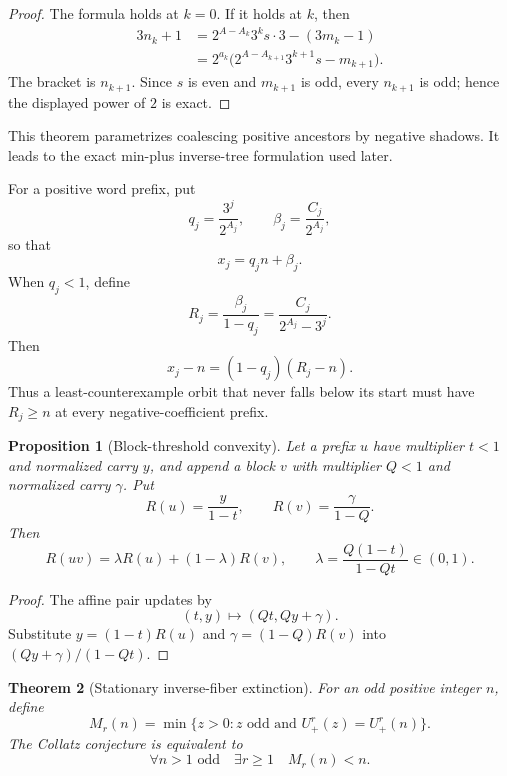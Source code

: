 \documentclass[11pt]{article}
\newtheorem{theorem}{Theorem}[section]
\newtheorem{proposition}[theorem]{Proposition}
\theoremstyle{definition}
\theoremstyle{remark}
\newcommand{\Up}{U_{+}}
\begin{document}
\begin{proof}
The formula holds at $k=0$.  If it holds at $k$, then
\[
 \begin{aligned}
 3n_k+1
 &=2^{A-A_k}3^ks\cdot3-(3m_k-1)\\
 &=2^{a_k}\bigl(2^{A-A_{k+1}}3^{k+1}s-m_{k+1}\bigr).
 \end{aligned}
\]
The bracket is $n_{k+1}$.  Since $s$ is even and $m_{k+1}$ is odd, every
$n_{k+1}$ is odd; hence the displayed power of $2$ is exact.
\end{proof}

This theorem parametrizes coalescing positive ancestors by negative shadows.
It leads to the exact min-plus inverse-tree formulation used later.

For a positive word prefix, put
\[
 q_j=\frac{3^j}{2^{A_j}},\qquad
 \beta_j=\frac{C_j}{2^{A_j}},
\]
so that
\[
 x_j=q_jn+\beta_j.                                    \tag{10.3}
\]
When $q_j<1$, define
\[
 R_j=\frac{\beta_j}{1-q_j}
 =\frac{C_j}{2^{A_j}-3^j}.                            \tag{10.4}
\]
Then
\[
 x_j-n=(1-q_j)(R_j-n).                                \tag{10.5}
\]
Thus a least-counterexample orbit that never falls below its start must have
$R_j\ge n$ at every negative-coefficient prefix.

\begin{proposition}[Block-threshold convexity]\label{prop:convexity}
Let a prefix $u$ have multiplier $t<1$ and normalized carry $y$, and append a
block $v$ with multiplier $Q<1$ and normalized carry $\gamma$.  Put
\[
 R(u)=\frac{y}{1-t},\qquad R(v)=\frac{\gamma}{1-Q}.
\]
Then
\[
 R(uv)=\lambda R(u)+(1-\lambda)R(v),
 \qquad
 \lambda=\frac{Q(1-t)}{1-Qt}\in(0,1).                \tag{10.6}
\]
\end{proposition}

\begin{proof}
The affine pair updates by
\[
 (t,y)\longmapsto(Qt,Qy+\gamma).
\]
Substitute $y=(1-t)R(u)$ and $\gamma=(1-Q)R(v)$ into
$(Qy+\gamma)/(1-Qt)$.
\end{proof}

\begin{theorem}[Stationary inverse-fiber extinction]\label{thm:SFE}
For an odd positive integer $n$, define
\[
 M_r(n)=\min\{z>0:z\text{ odd and }\Up^r(z)=\Up^r(n)\}. \tag{10.7}
\]
The Collatz conjecture is equivalent to
\[
 \forall n>1\text{ odd}\quad\exists r\ge1
 \quad M_r(n)<n.                                      \tag{10.8}
\]
\end{theorem}
\end{document}
